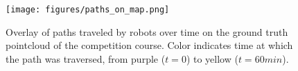 \documentclass[letterpaper, 10 pt, conference]{ieeeconf}  %
\newcommand{\ph}[1]{{\textbf{#1}:}} %
\newcommand{\argmax}{\mathop{\mathrm{argmax}}}
\begin{document}
\begin{figure}[ht!]
  \texttt{[image: figures/paths\_on\_map.png]}
  \centering
  \caption{Overlay of paths traveled by robots over time on the ground truth pointcloud of the competition course.  Color indicates time at which the path was traversed, from purple ($t=0$) to yellow ($t=60min$).}
  \label{fig:paths_on_map}
\end{figure}











\end{document}

